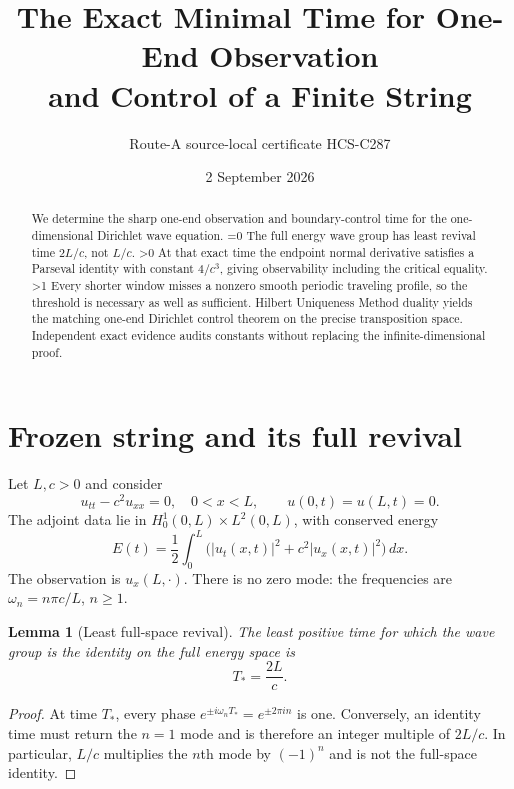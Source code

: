 \documentclass[10pt]{article}
\title{The Exact Minimal Time for One-End Observation\\
and Control of a Finite String}
\author{Route-A source-local certificate HCS-C287}
\date{2 September 2026}
\providecommand{\CRevisionRound}{2}
\newtheorem{lemma}{Lemma}
\newcommand{\Tstar}{T_\ast}
\begin{document}
\maketitle

\begin{abstract}
We determine the sharp one-end observation and boundary-control time for the
one-dimensional Dirichlet wave equation.
\ifnum\CRevisionRound=0
The full energy wave group has least revival time $2L/c$, not $L/c$.
\fi
\ifnum\CRevisionRound>0
At that exact time the endpoint normal derivative satisfies a Parseval
identity with constant $4/c^3$, giving observability including the critical
equality.
\fi
\ifnum\CRevisionRound>1
Every shorter window misses a nonzero smooth periodic traveling profile, so
the threshold is necessary as well as sufficient.  Hilbert Uniqueness Method
duality yields the matching one-end Dirichlet control theorem on the precise
transposition space.  Independent exact evidence audits constants without
replacing the infinite-dimensional proof.
\fi
\end{abstract}

\section{Frozen string and its full revival}
Let $L,c>0$ and consider
\begin{equation}\label{eq:wave}
 u_{tt}-c^2u_{xx}=0,\quad 0<x<L,\qquad
 u(0,t)=u(L,t)=0.
\end{equation}
The adjoint data lie in $H_0^1(0,L)\times L^2(0,L)$, with conserved energy
\begin{equation}\label{eq:energy}
 E(t)=\frac12\int_0^L\bigl(|u_t(x,t)|^2+c^2|u_x(x,t)|^2\bigr)\,dx.
\end{equation}
The observation is $u_x(L,\cdot)$.  There is no zero mode: the frequencies
are $\omega_n=n\pi c/L$, $n\ge1$.

\begin{lemma}[Least full-space revival]\label{lem:revival}
The least positive time for which the wave group is the identity on the full
energy space is
\[
 \Tstar=\frac{2L}{c}.
\]
\end{lemma}
\begin{proof}
At time $\Tstar$, every phase $e^{\pm i\omega_n\Tstar}=e^{\pm2\pi in}$ is
one.  Conversely, an identity time must return the $n=1$ mode and is therefore
an integer multiple of $2L/c$.  In particular, $L/c$ multiplies the $n$th
mode by $(-1)^n$ and is not the full-space identity.
\end{proof}
\end{document}
